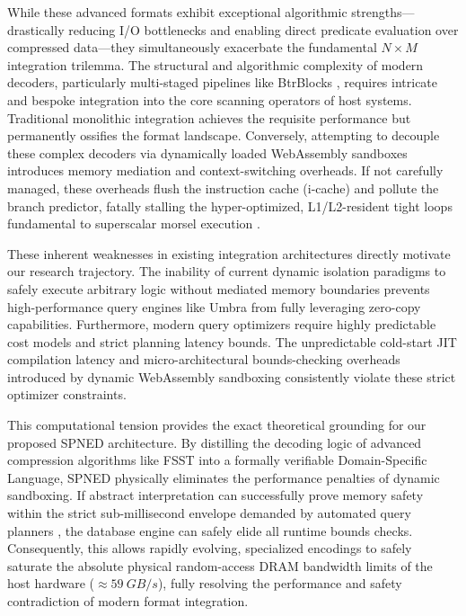 \documentclass[onecolumn]{IEEEtran}
\numberwithin{equation}{section}
\theoremstyle{definition}
\theoremstyle{remark}
\begin{document}
While these advanced formats exhibit exceptional algorithmic strengths---drastically reducing I/O bottlenecks and enabling direct predicate evaluation over compressed data---they simultaneously exacerbate the fundamental $N \times M$ integration trilemma. The structural and algorithmic complexity of modern decoders, particularly multi-staged pipelines like BtrBlocks \cite{kuschewski2023btrblocks}, requires intricate and bespoke integration into the core scanning operators of host systems. Traditional monolithic integration achieves the requisite performance but permanently ossifies the format landscape. Conversely, attempting to decouple these complex decoders via dynamically loaded WebAssembly sandboxes introduces memory mediation and context-switching overheads. If not carefully managed, these overheads flush the instruction cache (i-cache) and pollute the branch predictor, fatally stalling the hyper-optimized, L1/L2-resident tight loops fundamental to superscalar morsel execution \cite{leis2014morsel}.

These inherent weaknesses in existing integration architectures directly motivate our research trajectory. The inability of current dynamic isolation paradigms to safely execute arbitrary logic without mediated memory boundaries prevents high-performance query engines like Umbra \cite{neumann2020umbra} from fully leveraging zero-copy capabilities. Furthermore, modern query optimizers \cite{anneser2023autosteer} require highly predictable cost models and strict planning latency bounds. The unpredictable cold-start JIT compilation latency and micro-architectural bounds-checking overheads introduced by dynamic WebAssembly sandboxing consistently violate these strict optimizer constraints.

This computational tension provides the exact theoretical grounding for our proposed SPNED architecture. By distilling the decoding logic of advanced compression algorithms like FSST \cite{boncz2020fsst} into a formally verifiable Domain-Specific Language, SPNED physically eliminates the performance penalties of dynamic sandboxing. If abstract interpretation can successfully prove memory safety within the strict sub-millisecond envelope demanded by automated query planners \cite{anneser2023autosteer}, the database engine can safely elide all runtime bounds checks. Consequently, this allows rapidly evolving, specialized encodings \cite{kuschewski2023btrblocks} to safely saturate the absolute physical random-access DRAM bandwidth limits of the host hardware ($\approx \SI{59}{GB/s}$), fully resolving the performance and safety contradiction of modern format integration.
\end{document}
